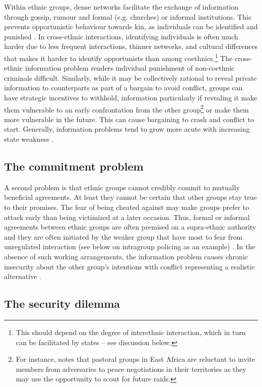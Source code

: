 \documentclass[12pt]{article}
\begin{document}
Within ethnic groups, dense networks facilitate the exchange of information
through gossip, rumour and formal (e.g. churches) or informal institutions. This
prevents opportunistic behaviour towards kin, as individuals can be identified
and punished \citep[719]{Fearon_1996}. In cross-ethnic interactions,
identifying individuals is often much harder due to less frequent interactions,
thinner networks, and cultural differences that makes it harder to identify
opportunists than among coethnics.\footnote{This should depend on the degree of
interethnic interaction, which in turn can be facilitated by states – see
discussion below.} The cross-ethnic information problem renders individual
punishment of non-coethnic criminals difficult. Similarly, while it may be
collectively rational to reveal private information to counterparts as part of a
bargain to avoid conflict, groups can have strategic incentives to withhold,
information particularly if revealing it make them vulnerable to an early
confrontation from the other group\footnote{For instance, \citet{Eaton_2008}
	notes that pastoral groups in East Africa are reluctant to invite
	members from adversaries to peace negotiations in their territories as
they may use the opportunity to scout for future raids.} or make them more
vulnerable in the future. This can cause bargaining to crash and conflict to
start. Generally, information problems tend to grow more acute with increasing
state weakness \citep[46]{Fearon1995, Lake_1996}.

\subsection{The commitment problem}

A second problem is that ethnic groups cannot credibly commit to mutually
beneficial agreements. At least they cannot be certain that other groups stay
true to their promises. The fear of being cheated against may make groups prefer
to attack early than being victimized at a later occasion. Thus, formal or
informal agreements between ethnic groups are often premised on a supra-ethnic
authority and they are often initiated by the weaker group that have most to
fear from unregulated interaction (see below on intragroup policing as an
example) \citep[50]{Lake_1996}. In the absence of such working
arrangements, the information problem causes chronic insecurity about the other
group’s intentions with conflict representing a realistic alternative
\citep[51]{Lake_1996}.

\subsection{The security dilemma}
\end{document}
